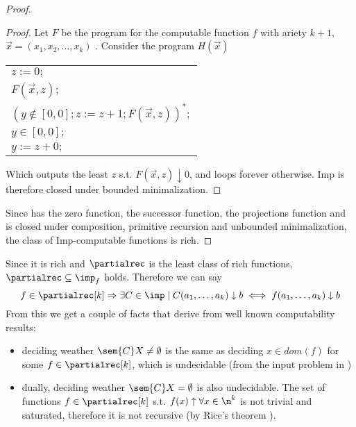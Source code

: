 \begin{proof}
  \begin{proof}
    Let \(F\) be the program for the computable function \(f\)
    with ariety \(k+1\), \(\vec{x} = (x_1, x_2, \dots, x_k)\)
    . Consider the program \(H(\vec{x})\)
    \begin{center}
      \begin{tabular}{l}
        \(z := 0;\)\\[0pt]
        \(F(\vec{x},z);\)\\[0pt]
        \((y \not\in [0,0];z := z + 1;F(\vec{x},z))^*;\)\\[0pt]
        \(y\in [0,0];\)\\[0pt]
        \(y := z + 0;\)\\[0pt]
      \end{tabular}

    \end{center}
    Which outputs the least \(z\) s.t. \(F(\vec{x},z) \downarrow 0\),
    and loops forever otherwise. Imp is therefore closed under bounded
    minimalization.
  \end{proof}
  Since has the zero function, the successor function, the projections
  function and is closed under composition, primitive recursion and
  unbounded minimalization, the class of Imp-computable functions is
  rich.
\end{proof}

Since it is rich and \(\partialrec\) is the least class of rich
functions, \(\partialrec \subseteq \imp_f\) holds. Therefore we can
say \[f \in \partialrec[k] \Rightarrow \exists C \in \imp \mid C(a_1,
\dots, a_k)\downarrow b \iff f(a_1, \dots, a_k) \downarrow b\] From
this we get a couple of facts that derive from well known
computability results:
\begin{itemize}
\item deciding weather \(\sem{C}X \neq \emptyset\) is the same as
  deciding \(x \in dom(f)\) for some \(f \in \partialrec[k]\), which
  is undecidable (from the input problem in
  \cite[p.~104]{cutland1980computability})
\item dually, deciding weather \(\sem{C}X = \emptyset\) is also
  undecidable. The set of functions \(f\in \partialrec[k]\)
  s.t. \(f(x) \uparrow \forall x \in \n^k\) is not trivial and
  saturated, therefore it is not recursive (by Rice's theorem
  \cite{rice1953classes}).
\end{itemize}
